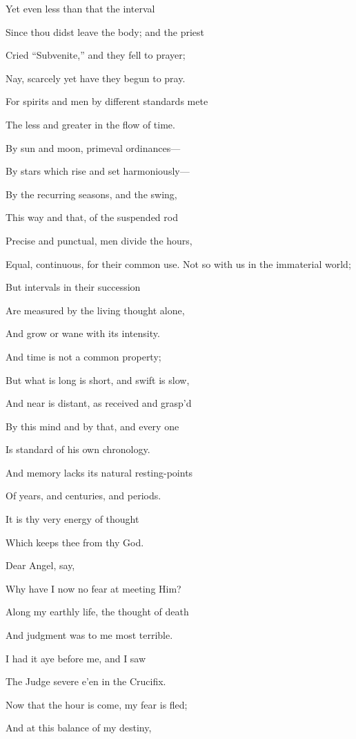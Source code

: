 Yet even less than that the interval

Since thou didst leave the body; and the priest

Cried ``Subvenite,'' and they fell to prayer;

Nay, scarcely yet have they begun to pray.

For spirits and men by different standards mete

The less and greater in the flow of time.

By sun and moon, primeval ordinances—

By stars which rise and set harmoniously—

By the recurring seasons, and the swing,

This way and that, of the suspended rod

Precise and punctual, men divide the hours,

Equal, continuous, for their common use. Not so with us in the immaterial world;

But intervals in their succession

Are measured by the living thought alone,

And grow or wane with its intensity.

And time is not a common property;

But what is long is short, and swift is slow,

And near is distant, as received and grasp'd

By this mind and by that, and every one

Is standard of his own chronology.

And memory lacks its natural resting-points

Of years, and centuries, and periods.

It is thy very energy of thought

Which keeps thee from thy God.


Dear Angel, say,

Why have I now no fear at meeting Him?

Along my earthly life, the thought of death

And judgment was to me most terrible.

I had it aye before me, and I saw

The Judge severe e'en in the Crucifix.

Now that the hour is come, my fear is fled;

And at this balance of my destiny,

